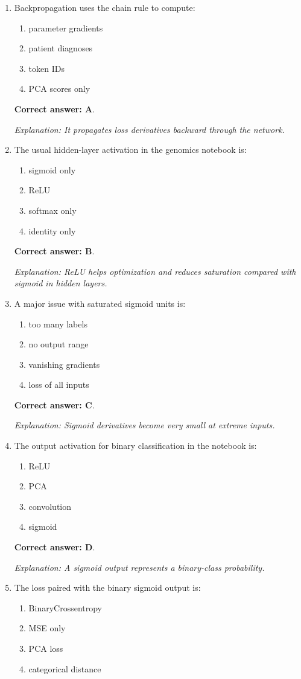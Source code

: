 \documentclass[10pt,a4paper]{article}
\newcommand{\ans}[1]{\par\textbf{Correct answer: #1}}
\newcommand{\expn}[1]{\par\textit{Explanation: #1}}
\begin{document}
\begin{enumerate}[label=\textbf{\arabic*.},itemsep=4pt]
\ans{D}. \expn{Inputs pass through layers to produce an output prediction.}
\item Backpropagation uses the chain rule to compute:
\begin{enumerate}[label=\Alph*.,itemsep=0pt]\item parameter gradients\item patient diagnoses\item token IDs\item PCA scores only\end{enumerate}
\ans{A}. \expn{It propagates loss derivatives backward through the network.}
\item The usual hidden-layer activation in the genomics notebook is:
\begin{enumerate}[label=\Alph*.,itemsep=0pt]\item sigmoid only\item ReLU\item softmax only\item identity only\end{enumerate}
\ans{B}. \expn{ReLU helps optimization and reduces saturation compared with sigmoid in hidden layers.}
\item A major issue with saturated sigmoid units is:
\begin{enumerate}[label=\Alph*.,itemsep=0pt]\item too many labels\item no output range\item vanishing gradients\item loss of all inputs\end{enumerate}
\ans{C}. \expn{Sigmoid derivatives become very small at extreme inputs.}
\item The output activation for binary classification in the notebook is:
\begin{enumerate}[label=\Alph*.,itemsep=0pt]\item ReLU\item PCA\item convolution\item sigmoid\end{enumerate}
\ans{D}. \expn{A sigmoid output represents a binary-class probability.}
\item The loss paired with the binary sigmoid output is:
\begin{enumerate}[label=\Alph*.,itemsep=0pt]\item BinaryCrossentropy\item MSE only\item PCA loss\item categorical distance\end{enumerate}

\end{enumerate}
\end{document}
